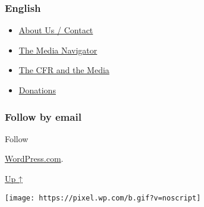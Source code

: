 \hypertarget{english}{%
\subsubsection{English}\label{english}}

\begin{itemize}
\tightlist
\item
  \href{https://swprs.org/contact/}{About Us / Contact}
\item
  \href{https://swprs.org/media-navigator/}{The Media Navigator}
\item
  \href{https://swprs.org/the-american-empire-and-its-media/}{The CFR
  and the Media}
\item
  \href{https://swprs.org/donations/}{Donations}
\end{itemize}

\hypertarget{follow-by-email}{%
\subsubsection{Follow by email}\label{follow-by-email}}

Follow

\href{https://wordpress.com/?ref=footer_custom_com}{WordPress.com}.

\protect\hyperlink{}{Up ↑}

\texttt{[image: https://pixel.wp.com/b.gif?v=noscript]}
